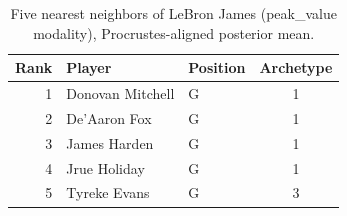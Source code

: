 \begin{table}[htbp]
  \centering\small
  \begin{tabular}{rllc}
    \toprule
    Rank & Player & Position & Archetype \\
    \midrule
    1 & Donovan Mitchell & G & 1 \\
    2 & De'Aaron Fox & G & 1 \\
    3 & James Harden & G & 1 \\
    4 & Jrue Holiday & G & 1 \\
    5 & Tyreke Evans & G & 3 \\
    \bottomrule
  \end{tabular}
  \caption{Five nearest neighbors of LeBron James (peak_value modality), Procrustes-aligned posterior mean.}
  \label{tab:LeBron_James_neighbors_peak_value}
\end{table}

